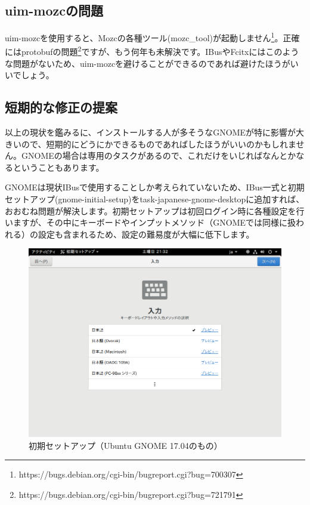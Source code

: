 \documentclass[mingoth,a4paper]{jsarticle}
\begin{document}
\pagebreak
\subsection{uim-mozcの問題}

uim-mozcを使用すると、Mozcの各種ツール(mozc\_tool)が起動しません\footnote{https://bugs.debian.org/cgi-bin/bugreport.cgi?bug=700307}。正確にはprotobufの問題\footnote{https://bugs.debian.org/cgi-bin/bugreport.cgi?bug=721791}ですが、もう何年も未解決です。IBusやFcitxにはこのような問題がないため、uim-mozcを避けることができるのであれば避けたほうがいいでしょう。

\subsection{短期的な修正の提案}

以上の現状を鑑みるに、インストールする人が多そうなGNOMEが特に影響が大きいので、短期的にどうにかできるものであればしたほうがいいのかもしれません。GNOMEの場合は専用のタスクがあるので、これだけをいじればなんとかなるということもあります。

GNOMEは現状IBusで使用することしか考えられていないため、IBus一式と初期セットアップ(gnome-initial-setup)をtask-japanese-gnome-desktopに追加すれば、おおむね問題が解決します。初期セットアップは初回ログイン時に各種設定を行いますが、その中にキーボードやインプットメソッド（GNOMEでは同様に扱われる）の設定も含まれるため、設定の難易度が大幅に低下します。

\begin{figure}[htbp!]
\centering
\includegraphics[width=\linewidth]{image201708/gnome-initial-setup.png}
\caption{初期セットアップ（Ubuntu GNOME 17.04のもの）}
\end{figure}
\end{document}
